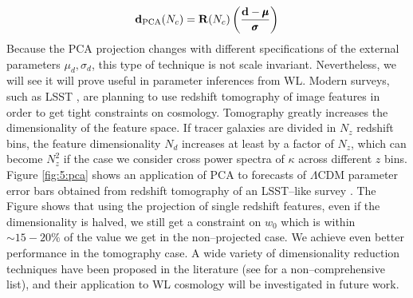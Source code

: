 \begin{equation}
\label{eq:5:pca-projection}
\mathbf{d}_{\rm PCA}(N_c) = \mathbf{R}(N_c)\left(\frac{\mathbf{d}-\pmb{\mu}}{\pmb{\sigma}}\right)
\end{equation}
%
Because the PCA projection changes with different specifications of the external parameters $\mu_d,\sigma_d$, this type of technique is not scale invariant. Nevertheless, we will see it will prove useful in parameter inferences from WL. Modern surveys, such as LSST \citep{LSST}, are planning to use redshift tomography of image features in order to get tight constraints on cosmology. Tomography greatly increases the dimensionality of the feature space. If tracer galaxies are divided in $N_z$ redshift bins, the feature dimensionality $N_d$ increases at least by a factor of $N_z$, which can become $N_z^2$ if the case we consider cross power spectra of $\kappa$ across different $z$ bins. Figure \ref{fig:5:pca} shows an application of PCA to forecasts of $\Lambda$CDM parameter error bars obtained from redshift tomography of an LSST--like survey \citep{PetriPhotoZ}. The Figure shows that using the projection of single redshift features, even if the dimensionality is halved, we still get a constraint on $w_0$ which is within $\sim 15-20\%$ of the value we get in the non--projected case. We achieve even better performance in the tomography case. A wide variety of dimensionality reduction techniques have been proposed in the literature (see \citep{astroMLText} for a non--comprehensive list), and their application to WL cosmology will be investigated in future work.  

